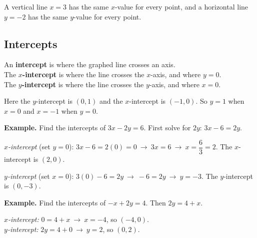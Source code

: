 \documentclass[letter]{article}
\newenvironment{keybox}
  {\begin{lrbox}{\keyboxsave}\begin{minipage}{\dimexpr\linewidth-2\fboxsep-2\fboxrule\relax}}
  {\end{minipage}\end{lrbox}\par\noindent\fbox{\usebox{\keyboxsave}}\par}
\begin{document}
A vertical line $x=3$ has the same $x$-value for every point, and a horizontal line $y=-2$ has the same $y$-value for every point.

\subsection{Intercepts}

\begin{keybox}
An \textbf{intercept} is where the graphed line crosses an axis.\\[4pt]
The \textbf{$x$-intercept} is where the line crosses the $x$-axis, and where $y=0$.\\
The \textbf{$y$-intercept} is where the line crosses the $y$-axis, and where $x=0$.
\end{keybox}

\begin{center}
\end{center}

Here the $y$-intercept is $(0,1)$ and the $x$-intercept is $(-1,0)$. So $y=1$ when $x=0$ and $x=-1$ when $y=0$.

\textbf{Example.} Find the intercepts of $3x-2y=6$. First solve for $2y$: $3x-6=2y$.

\emph{$x$-intercept} (set $y=0$): $3x-6=2(0)=0\ \to\ 3x=6\ \to\ x=\dfrac63=2$. The $x$-intercept is $(2,0)$.

\emph{$y$-intercept} (set $x=0$): $3(0)-6=2y\ \to\ -6=2y\ \to\ y=-3$. The $y$-intercept is $(0,-3)$.

\textbf{Example.} Find the intercepts of $-x+2y=4$. Then $2y=4+x$.

\emph{$x$-intercept:} $0=4+x\ \to\ x=-4$, so $(-4,0)$.\\
\emph{$y$-intercept:} $2y=4+0\ \to\ y=2$, so $(0,2)$.
\end{document}
